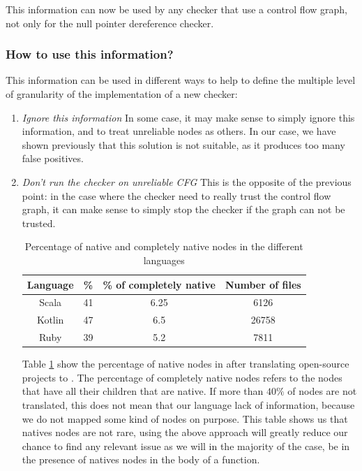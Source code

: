 This information can now be used by any checker that use a control flow graph, not only for the null pointer dereference checker.

\subsubsection{How to use this information?}
\label{subsubsec:use_unreliable_information}

This information can be used in different ways to help to define the multiple level of granularity of the implementation of a new checker:

\begin{enumerate}
\item \textit{Ignore this information} \newline
In some case, it may make sense to simply ignore this information, and to treat unreliable nodes as others. 
In our case, we have shown previously that this solution is not suitable, as it produces too many false positives. \newline

\item \textit{Don’t run the checker on unreliable CFG} \newline
This is the opposite of the previous point: in the case where the checker need to really trust the control flow graph, it can make sense to simply stop the checker if the graph can not be trusted.

\begin{table}[h]
	\centering
	\caption{Percentage of native and completely native nodes in the different languages}
	\label{table:slang-native-percentage}
	\begin{tabular}{|c|c|c|c|}
		\hline
		\bf Language & \bf \% & \bf \% of completely native & \bf Number of files \\ \hline
		Scala &  41 &  6.25 & 6126 \\ 
		Kotlin &  47 &  6.5 & 26758 \\ 
		Ruby &  39 &  5.2 &  7811 \\ \hline
	\end{tabular}
\end{table}

Table \ref{table:slang-native-percentage} show the percentage of native nodes in \slang after translating open-source projects \cite{SlangSources:2019:Online} to \slang. The percentage of completely native nodes refers to the nodes that have all their children that are native. If more than $40\%$ of nodes are not translated, this does not mean that our language lack of information, because we do not mapped some kind of nodes on purpose.
This table shows us that natives nodes are not rare, using the above approach will greatly reduce our chance to find any relevant issue as we will in the majority of the case, be in the presence of natives nodes in the body of a function.


\end{enumerate}
